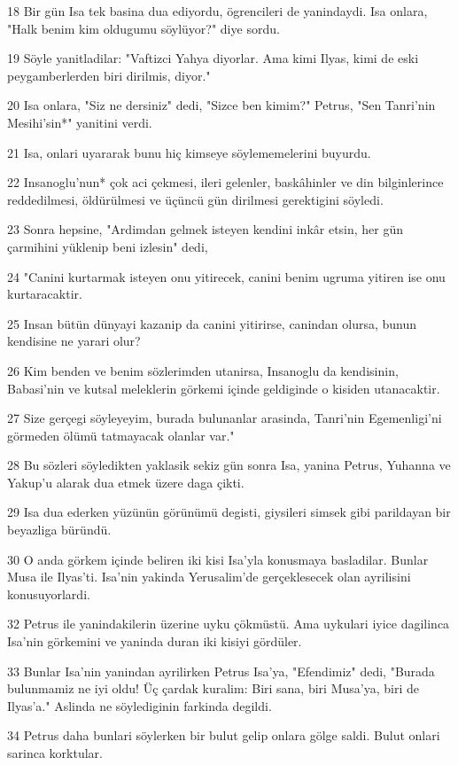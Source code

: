 \par 18 Bir gün Isa tek basina dua ediyordu, ögrencileri de yanindaydi. Isa onlara, "Halk benim kim oldugumu söylüyor?" diye sordu.
\par 19 Söyle yanitladilar: "Vaftizci Yahya diyorlar. Ama kimi Ilyas, kimi de eski peygamberlerden biri dirilmis, diyor."
\par 20 Isa onlara, "Siz ne dersiniz" dedi, "Sizce ben kimim?" Petrus, "Sen Tanri'nin Mesihi'sin*" yanitini verdi.
\par 21 Isa, onlari uyararak bunu hiç kimseye söylememelerini buyurdu.
\par 22 Insanoglu'nun* çok aci çekmesi, ileri gelenler, baskâhinler ve din bilginlerince reddedilmesi, öldürülmesi ve üçüncü gün dirilmesi gerektigini söyledi.
\par 23 Sonra hepsine, "Ardimdan gelmek isteyen kendini inkâr etsin, her gün çarmihini yüklenip beni izlesin" dedi,
\par 24 "Canini kurtarmak isteyen onu yitirecek, canini benim ugruma yitiren ise onu kurtaracaktir.
\par 25 Insan bütün dünyayi kazanip da canini yitirirse, canindan olursa, bunun kendisine ne yarari olur?
\par 26 Kim benden ve benim sözlerimden utanirsa, Insanoglu da kendisinin, Babasi'nin ve kutsal meleklerin görkemi içinde geldiginde o kisiden utanacaktir.
\par 27 Size gerçegi söyleyeyim, burada bulunanlar arasinda, Tanri'nin Egemenligi'ni görmeden ölümü tatmayacak olanlar var."
\par 28 Bu sözleri söyledikten yaklasik sekiz gün sonra Isa, yanina Petrus, Yuhanna ve Yakup'u alarak dua etmek üzere daga çikti.
\par 29 Isa dua ederken yüzünün görünümü degisti, giysileri simsek gibi parildayan bir beyazliga büründü.
\par 30 O anda görkem içinde beliren iki kisi Isa'yla konusmaya basladilar. Bunlar Musa ile Ilyas'ti. Isa'nin yakinda Yerusalim'de gerçeklesecek olan ayrilisini konusuyorlardi.
\par 32 Petrus ile yanindakilerin üzerine uyku çökmüstü. Ama uykulari iyice dagilinca Isa'nin görkemini ve yaninda duran iki kisiyi gördüler.
\par 33 Bunlar Isa'nin yanindan ayrilirken Petrus Isa'ya, "Efendimiz" dedi, "Burada bulunmamiz ne iyi oldu! Üç çardak kuralim: Biri sana, biri Musa'ya, biri de Ilyas'a." Aslinda ne söylediginin farkinda degildi.
\par 34 Petrus daha bunlari söylerken bir bulut gelip onlara gölge saldi. Bulut onlari sarinca korktular.
